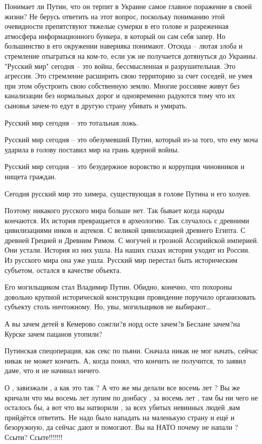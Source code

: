 Понимает ли Путин, что он терпит в Украине самое главное поражение в своей
жизни? Не берусь ответить на этот вопрос, поскольку пониманию этой очевидности
препятствуют тяжелые сумерки в его голове и разреженная атмосфера
информационного бункера, в который он сам себя запер. Но большинство в его
окружении наверняка понимают. Отсюда – лютая злоба и стремление отыграться на
ком-то, если уж не получается дотянуться до Украины. "Русский мир" сегодня –
это война, бессмысленная и разрушительная. Это агрессия. Это стремление
расширить свою территорию за счет соседей, не умея при этом обустроить свою
собственную землю. Многие россияне живут без канализации без нормальных дорог и
одновременно радуются тому что их сыновья зачем-то едут в другую страну убивать
и умирать.

Русский мир сегодня – это тотальная ложь.

Русский мир сегодня – это обезумевший Путин, который из-за того, что ему моча
ударила в голову поставил мир на грань ядерной войны.

Русский мир сегодня – это безудержное воровство и коррупция чиновников и нищета
граждан.

Сегодня русский мир это химера, существующая в голове Путина и его холуев.

Поэтому никакого русского мира больше нет. Так бывает когда народы кончаются.
Их история превращается в археологию. Так случалось с древними цивилизациями
инков и ацтеков. С великой цивилизацией древнего Египта. С древней Грецией и
Древним Римом. С могучей и грозной Ассирийской империей. Они устали. История из
них ушла. На наших глазах история уходит из России. Из русского мира она уже
ушла. Русский мир перестал быть историческим субъетом, остался в качестве
объекта.

Его могильщиком стал Владимир Путин. Обидно, конечно, что похороны довольно
крупной исторической конструкции провидение поручило организовать субъекту
столь ничтожному. Но, увы, могильщиков не выбирают…

А вы зачем детей в Кемерово сожгли?в норд осте зачем?в Беслане зачем?на Курске
зачем пацанов утопили?



Путинская спецоперация, как секс по пьяни. Сначала никак не мог начать, сейчас
никак не может кончить. А, когда понял, что кончить не получится, то заявил
даме, что и не начинал ничего.

О , завизжали , а как это так ? А что же мы делали все восемь лет ? Вы же
кричали что мы восемь лет лупим по донбасу , за восемь лет , там бы ни чего не
осталось бы, а вот что вы натворили , за всех убитых невинных людей ,вам
прийдётся ответить. Не надо было нападать на маленькую страну и ещё и
безоружную, да сейчас дают и помогают. Вы на НАТО почему не напали ? Ссыти?
Ссыте!!!!!!!

